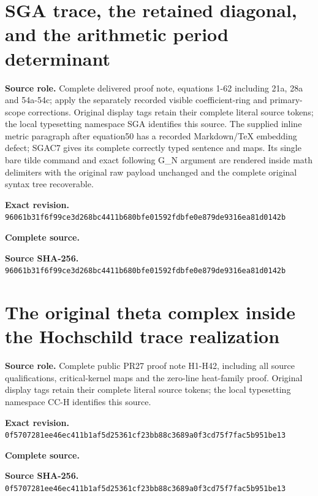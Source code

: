 \section{SGA trace, the retained diagonal, and the arithmetic period determinant}
\noindent\textbf{Source role.} Complete delivered proof note, equations 1-62 including 21a, 28a and 54a-54c; apply the separately recorded visible coefficient-ring and primary-scope corrections. Original display tags retain their complete literal source tokens; the local typesetting namespace SGA identifies this source. The supplied inline metric paragraph after equation50 has a recorded Markdown/TeX embedding defect; SGAC7 gives its complete correctly typed sentence and maps. Its single bare tilde command and exact following G\_N argument are rendered inside math delimiters with the original raw payload unchanged and the complete original syntax tree recoverable.\par
\noindent\textbf{Exact revision.} \nolinkurl{96061b31f6f99ce3d268bc4411b680bfe01592fdbfe0e879de9316ea81d0142b}\par
\noindent\textbf{Complete source.} \par
\noindent\textbf{Source SHA-256.} \nolinkurl{96061b31f6f99ce3d268bc4411b680bfe01592fdbfe0e879de9316ea81d0142b}\par\medskip

\endgroup

\begingroup
\sloppy
\small
\makeatletter
\let\EndpointOriginalTagForm\tagform@
\def\tagform@#1{\EndpointOriginalTagForm{CC-H\, #1}}
\makeatother
\clearpage
\section{The original theta complex inside the Hochschild trace realization}
\noindent\textbf{Source role.} Complete public PR27 proof note H1-H42, including all source qualifications, critical-kernel maps and the zero-line heat-family proof. Original display tags retain their complete literal source tokens; the local typesetting namespace CC-H identifies this source.\par
\noindent\textbf{Exact revision.} \nolinkurl{0f5707281ee46ec411b1af5d25361cf23bb88c3689a0f3cd75f7fac5b951be13}\par
\noindent\textbf{Complete source.} \par
\noindent\textbf{Source SHA-256.} \nolinkurl{0f5707281ee46ec411b1af5d25361cf23bb88c3689a0f3cd75f7fac5b951be13}\par\medskip

\endgroup

